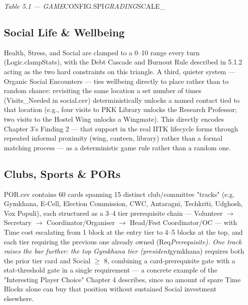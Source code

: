 
\emph{Table 5.1 --- GAME}CONFIG.SPI\emph{GRADING}SCALE_

\subsection{Social Life & Wellbeing}

Health, Stress, and Social are clamped to a 0--10 range every turn (Logic.clampStats), with the Debt Cascade and Burnout Rule described in 5.1.2 acting as the two hard constraints on this triangle. A third, quieter system --- Organic Social Encounters --- ties wellbeing directly to place rather than to random chance: revisiting the same location a set number of times (Visits_Needed in social.csv) deterministically unlocks a named contact tied to that location (e.g., four visits to PKK Library unlocks the Research Professor; two visits to the Hostel Wing unlocks a Wingmate). This directly encodes Chapter 3's Finding 2 --- that support in the real IITK lifecycle forms through repeated informal proximity (wing, canteen, library) rather than a formal matching process --- as a deterministic game rule rather than a random one.

\subsection{Clubs, Sports & PORs}

POR.csv contains 60 cards spanning 15 distinct club/committee "tracks" (e.g. Gymkhana, E-Cell, Election Commission, CWC, Antaragni, Techkriti, Udghosh, Vox Populi), each structured as a 3--4 tier prerequisite chain --- Volunteer $\rightarrow$ Secretary $\rightarrow$ Coordinator/Organiser $\rightarrow$ Head/Fest Coordinator/OC --- with Time cost escalating from 1 block at the entry tier to 4--5 blocks at the top, and each tier requiring the previous one already owned (Req\emph{Prerequisite). One track raises the bar further: the top Gymkhana tier (president}gymkhana) requires both the prior tier card and Social $\geq$ 8, combining a card-prerequisite gate with a stat-threshold gate in a single requirement --- a concrete example of the "Interesting Player Choice" Chapter 4 describes, since no amount of spare Time Blocks alone can buy that position without sustained Social investment elsewhere.

